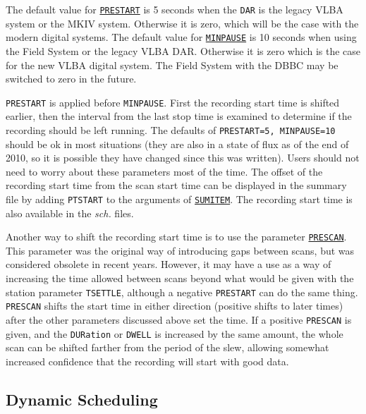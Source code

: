 \documentclass{report}
\begin{document}
The default value for 
{\hyperref[MP:PRESTART]{{\tt PRESTART}}} is 5 seconds
when the {\tt DAR} is the legacy VLBA system or the MKIV system.  Otherwise
it is zero, which will be the case with the modern digital systems.  The
default value for 
{\hyperref[MP:MINPAUSE]{{\tt MINPAUSE}}} is 10 seconds 
when using the Field System or the legacy VLBA DAR.  Otherwise it is
zero which is the case for the new VLBA digital system.  The Field System
with the DBBC may be switched to zero in the future.

{\tt PRESTART} is applied before {\tt MINPAUSE}.  First the recording
start time is shifted earlier, then the interval from the last
stop time is examined to determine if the recording should be left
running.  The defaults of {\tt PRESTART=5, MINPAUSE=10} should
be ok in most situations (they are also in a state of flux as of the
end of 2010, so it is possible they have changed since this was
written).  Users should not need to worry about
these parameters most of the time.  The offset of the recording start
time from the scan start time can be displayed in the summary
file by adding {\tt PTSTART} to the arguments of 
{\hyperref[MP:SUMITEM]{{\tt SUMITEM}}}.
The recording start time is also available in
the {\sl sch.} files.

Another way to shift the recording start time is to use the parameter
{\hyperref[MP:PRESCAN]{{\tt PRESCAN}}}.  This parameter was the original
way of introducing gaps between scans, but was considered obsolete in
recent years. However, it may have a use as a way of increasing the
time allowed between scans beyond what would be given with the station
parameter {\tt TSETTLE}, although a negative {\tt PRESTART} can do
the same thing.  {\tt PRESCAN} shifts the start time in
either direction (positive shifts to later times) after the other
parameters discussed above set the time.  If a positive {\tt PRESCAN}
is given, and the {\tt DURation} or {\tt DWELL} is increased by the
same amount, the whole scan can be shifted farther from the period of
the slew, allowing somewhat increased confidence that the recording
will start with good data.

\subsection{\label{SSEC:DYNAMIC}Dynamic Scheduling}
\end{document}
